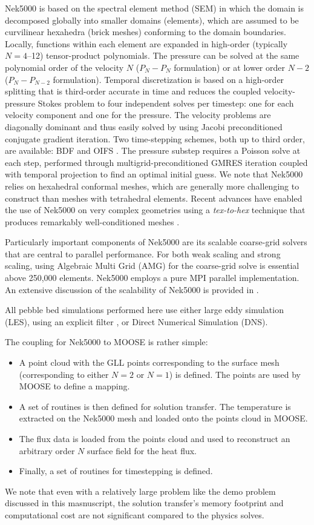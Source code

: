 Nek5000 is based on the spectral element method (SEM) \cite{patera1984} in which  the domain is decomposed 
globally into smaller domains (elements), which are assumed to be curvilinear hexahedra (brick meshes) 
conforming to the domain boundaries. Locally, functions within each element are expanded in high-order
(typically $N=4$--12) tensor-product polynomials.
The pressure can be solved at the same polynomial order of the velocity $N$ ($P_{N} - P_{N}$ formulation)
or at lower order $N-2$ ($P_{N} - P_{N-2}$ formulation). 
Temporal discretization is based on a high-order splitting that is third-order
accurate in time and reduces the coupled velocity-pressure Stokes problem to
four independent solves per timestep: one for each velocity component and one
for the pressure. The velocity problems are diagonally dominant and thus easily
solved by using Jacobi preconditioned conjugate gradient iteration. Two
time-stepping schemes, both up to third order, are available: BDF and OIFS
\cite{fischer2003implementation}. The pressure substep requires a Poisson solve
at each step, performed through multigrid-preconditioned GMRES iteration
coupled with temporal projection to find an optimal initial guess.
We note that Nek5000 relies on hexahedral conformal meshes, which are generally
more challenging to construct than meshes with tetrahedral elements.  Recent
advances have enabled the use of Nek5000 on very complex geometries using a
\textit{tex-to-hex} technique that produces remarkably well-conditioned
meshes \cite{yuan2020spectral}.


Particularly important components of Nek5000 are its scalable coarse-grid solvers that are central to
parallel performance. For both weak scaling and strong scaling, using Algebraic Multi Grid (AMG) for the
coarse-grid solve is essential above 250,000 elements. Nek5000 employs a pure MPI parallel implementation.
An extensive discussion of the scalability of Nek5000 is provided in \cite{offermans2016strong,fischer15,fischer20a}.

All pebble bed simulations performed here use either large eddy simulation (LES), using an explicit 
filter \cite{fischer2001filter}, or Direct Numerical Simulation (DNS).

The coupling for Nek5000 to MOOSE is rather simple:
\begin{itemize}
\item A point cloud with the GLL points corresponding to the surface mesh (corresponding to either $N = 2$ or $N = 1$) is defined. The points are used by MOOSE to define a mapping.
\item A set of routines is then defined for solution transfer. The temperature is extracted on the Nek5000 mesh and loaded onto the points cloud in MOOSE.
\item The flux data is loaded from the points cloud and used to reconstruct an arbitrary order $N$ surface field for the heat
flux.
\item Finally, a set of routines for timestepping is defined.
\end{itemize}
We note that even with a relatively large problem like the demo problem
discussed in this masnuscript, the solution transfer's memory footprint and
computational cost are not significant compared to the physics solves.


